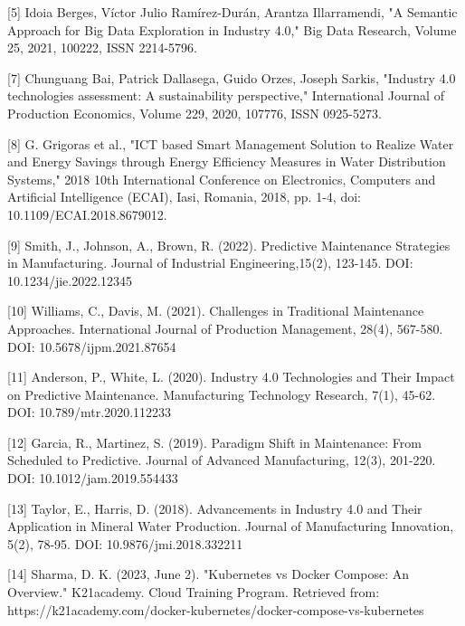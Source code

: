 \documentclass[conference]{IEEEtran}
\begin{document}
[5] Idoia Berges, Víctor Julio Ramírez-Durán, Arantza Illarramendi, "A Semantic Approach for Big Data Exploration in Industry 4.0," Big Data Research, Volume 25, 2021, 100222, ISSN 2214-5796.

[7] Chunguang Bai, Patrick Dallasega, Guido Orzes, Joseph Sarkis, "Industry 4.0 technologies assessment: A sustainability perspective," International Journal of Production Economics, Volume 229, 2020, 107776, ISSN 0925-5273.

[8] G. Grigoras et al., "ICT based Smart Management Solution to Realize Water and Energy Savings through Energy Efficiency Measures in Water Distribution Systems," 2018 10th International Conference on Electronics, Computers and Artificial Intelligence (ECAI), Iasi, Romania, 2018, pp. 1-4, doi: 10.1109/ECAI.2018.8679012.

[9] Smith, J., Johnson, A.,  Brown, R. (2022). Predictive Maintenance Strategies in Manufacturing. {Journal of Industrial Engineering},{15}(2), 123-145. DOI: 10.1234/jie.2022.12345

[10] Williams, C.,  Davis, M. (2021). Challenges in Traditional Maintenance Approaches. {International Journal of Production Management}, {28}(4), 567-580. DOI: 10.5678/ijpm.2021.87654

[11] Anderson, P.,  White, L. (2020). Industry 4.0 Technologies and Their Impact on Predictive Maintenance. {Manufacturing Technology Research}, {7}(1), 45-62. DOI: 10.789/mtr.2020.112233

[12] Garcia, R.,  Martinez, S. (2019). Paradigm Shift in Maintenance: From Scheduled to Predictive. {Journal of Advanced Manufacturing}, {12}(3), 201-220. DOI: 10.1012/jam.2019.554433

[13] Taylor, E.,  Harris, D. (2018). Advancements in Industry 4.0 and Their Application in Mineral Water Production. {Journal of Manufacturing Innovation}, {5}(2), 78-95. DOI: 10.9876/jmi.2018.332211

[14]  Sharma, D. K. (2023, June 2). "Kubernetes vs Docker Compose: An Overview." K21academy. Cloud Training Program. Retrieved from: https://k21academy.com/docker-kubernetes/docker-compose-vs-kubernetes

\vspace{12pt}
\end{document}
